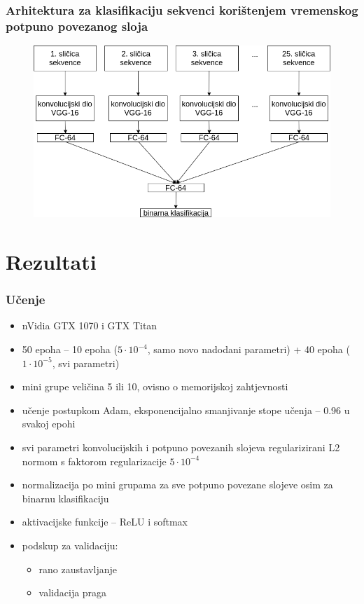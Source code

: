 \documentclass{beamer}
\begin{document}
\begin{frame}
\frametitle{Arhitektura za klasifikaciju sekvenci korištenjem vremenskog potpuno povezanog sloja}

 \begin{figure}[H]
\centering
\includegraphics[scale=0.35]{images/sequence_temporal.png}
\end{figure} 

\end{frame}

\section{Rezultati}

\begin{frame}
 \frametitle{Učenje}
 \begin{itemize}
 \item nVidia GTX 1070 i GTX Titan
  \item 50 epoha -- 10 epoha ($5\cdot10^{-4}$, samo novo nadodani parametri) + 40 epoha ($1\cdot10^{-5}$, svi parametri)
  \item mini grupe veličina 5 ili 10, ovisno o memorijskoj zahtjevnosti
  \item učenje postupkom Adam, eksponencijalno smanjivanje stope učenja -- 0.96 u svakoj epohi
  \item svi parametri konvolucijskih i potpuno povezanih slojeva regularizirani L2 normom s faktorom regularizacije $5\cdot10^{-4}$
  \item normalizacija po mini grupama za sve potpuno povezane slojeve osim za binarnu klasifikaciju
  \item aktivacijske funkcije -- ReLU i softmax
  \item podskup za validaciju:
  \begin{itemize}
   \item rano zaustavljanje
   \item validacija praga
  \end{itemize}

 \end{itemize}

\end{frame}
\end{document}
